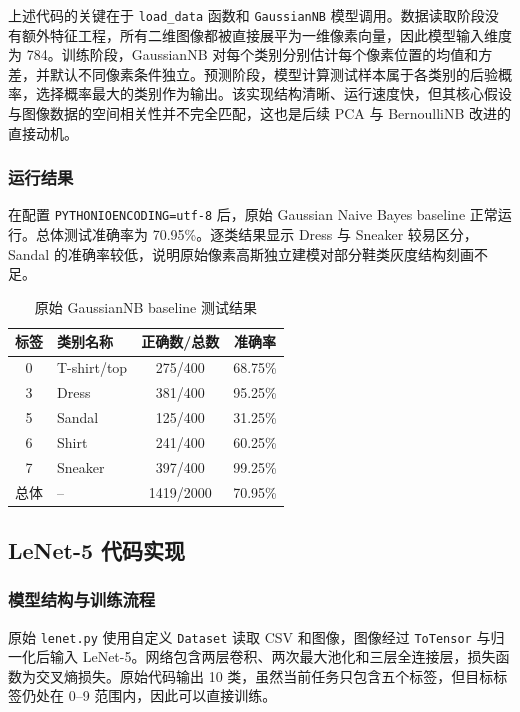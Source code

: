 \documentclass[UTF8]{ctexart}
\begin{document}
上述代码的关键在于 \texttt{load\_data} 函数和 \texttt{GaussianNB} 模型调用。数据读取阶段没有额外特征工程，所有二维图像都被直接展平为一维像素向量，因此模型输入维度为 784。训练阶段，GaussianNB 对每个类别分别估计每个像素位置的均值和方差，并默认不同像素条件独立。预测阶段，模型计算测试样本属于各类别的后验概率，选择概率最大的类别作为输出。该实现结构清晰、运行速度快，但其核心假设与图像数据的空间相关性并不完全匹配，这也是后续 PCA 与 BernoulliNB 改进的直接动机。

\subsubsection{运行结果}

在配置 \texttt{PYTHONIOENCODING=utf-8} 后，原始 Gaussian Naive Bayes baseline 正常运行。总体测试准确率为 70.95\%。逐类结果显示 Dress 与 Sneaker 较易区分，Sandal 的准确率较低，说明原始像素高斯独立建模对部分鞋类灰度结构刻画不足。

\begin{table}[H]
\centering
\caption{原始 GaussianNB baseline 测试结果}
\begin{tabular}{clcc}
\toprule
标签 & 类别名称 & 正确数/总数 & 准确率\\
\midrule
0 & T-shirt/top & 275/400 & 68.75\%\\
3 & Dress & 381/400 & 95.25\%\\
5 & Sandal & 125/400 & 31.25\%\\
6 & Shirt & 241/400 & 60.25\%\\
7 & Sneaker & 397/400 & 99.25\%\\
\midrule
总体 & -- & 1419/2000 & 70.95\%\\
\bottomrule
\end{tabular}
\end{table}

\subsection{LeNet-5 代码实现}

\subsubsection{模型结构与训练流程}

原始 \texttt{lenet.py} 使用自定义 \texttt{Dataset} 读取 CSV 和图像，图像经过 \texttt{ToTensor} 与归一化后输入 LeNet-5。网络包含两层卷积、两次最大池化和三层全连接层，损失函数为交叉熵损失。原始代码输出 10 类，虽然当前任务只包含五个标签，但目标标签仍处在 0--9 范围内，因此可以直接训练。
\end{document}
